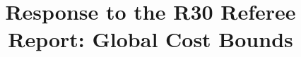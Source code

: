 
\usepackage{xr}

\begin{frontmatter}
\title{Response to the R30 Referee Report: Global Cost Bounds}
\begin{aug}\author[id=au1,addressref={add1}]{~}\address[id=add1]{}\end{aug}
\end{frontmatter}


